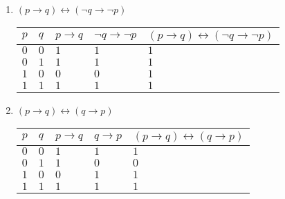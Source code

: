 \documentclass[12pt]{extarticle}
\begin{document}
\begin{enumerate}
		\item $(p \to q) \leftrightarrow (\neg q \to \neg p)$\\
			\begin{tabular}{ | p{2cm} | p{2cm} | p{2cm} | p{2cm} | p{3cm} |}
				\hline $p$ & $q$ & $p \to q$ & $\neg q \to \neg p$ & $(p \to q) \leftrightarrow (\neg q \to \neg p)$\\ \hline\hline
				$0$ & $0$ & $1$ & $1$ & $1$\\ \hline
				$0$ & $1$ & $1$ & $1$ & $1$\\ \hline
				$1$ & $0$ & $0$ & $0$ & $1$\\ \hline
				$1$ & $1$ & $1$ & $1$ & $1$\\ \hline
			\end{tabular}

		\item $(p \to q) \leftrightarrow (q \to p)$\\
			\begin{tabular}{ | p{2cm} | p{2cm} | p{2cm} | p{2cm} | p{3cm} |}
				\hline $p$ & $q$ & $p \to q$ & $q \to  p$ & $(p \to q) \leftrightarrow (q \to p)$\\ \hline\hline
				$0$ & $0$ & $1$ & $1$ & $1$\\ \hline
				$0$ & $1$ & $1$ & $0$ & $0$\\ \hline
				$1$ & $0$ & $0$ & $1$ & $1$\\ \hline
				$1$ & $1$ & $1$ & $1$ & $1$\\ \hline
			\end{tabular}

	\end{enumerate}	
	
\end{document}
